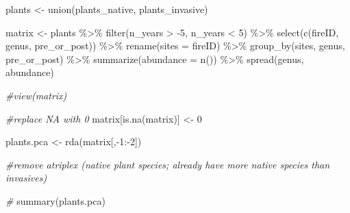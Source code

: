 \documentclass[
]{article}
\newenvironment{Shaded}{\begin{snugshade}}{\end{snugshade}}
\newcommand{\AttributeTok}[1]{\textcolor[rgb]{0.77,0.63,0.00}{#1}}
\newcommand{\CommentTok}[1]{\textcolor[rgb]{0.56,0.35,0.01}{\textit{#1}}}
\newcommand{\DecValTok}[1]{\textcolor[rgb]{0.00,0.00,0.81}{#1}}
\newcommand{\FunctionTok}[1]{\textcolor[rgb]{0.00,0.00,0.00}{#1}}
\newcommand{\NormalTok}[1]{#1}
\newcommand{\OtherTok}[1]{\textcolor[rgb]{0.56,0.35,0.01}{#1}}
\newcommand{\SpecialCharTok}[1]{\textcolor[rgb]{0.00,0.00,0.00}{#1}}
\begin{document}
\begin{Shaded}
\begin{Highlighting}[]
\NormalTok{plants }\OtherTok{\textless{}{-}} \FunctionTok{union}\NormalTok{(plants\_native, plants\_invasive)}

\NormalTok{matrix }\OtherTok{\textless{}{-}}\NormalTok{ plants }\SpecialCharTok{\%\textgreater{}\%}
  \FunctionTok{filter}\NormalTok{(n\_years }\SpecialCharTok{\textgreater{}} \SpecialCharTok{{-}}\DecValTok{5}\NormalTok{, n\_years }\SpecialCharTok{\textless{}} \DecValTok{5}\NormalTok{) }\SpecialCharTok{\%\textgreater{}\%}
  \FunctionTok{select}\NormalTok{(}\FunctionTok{c}\NormalTok{(fireID, genus, pre\_or\_post)) }\SpecialCharTok{\%\textgreater{}\%} 
  \FunctionTok{rename}\NormalTok{(}\AttributeTok{sites =}\NormalTok{ fireID) }\SpecialCharTok{\%\textgreater{}\%}  
  \FunctionTok{group\_by}\NormalTok{(sites, genus, pre\_or\_post) }\SpecialCharTok{\%\textgreater{}\%} 
  \FunctionTok{summarize}\NormalTok{(}\AttributeTok{abundance =} \FunctionTok{n}\NormalTok{()) }\SpecialCharTok{\%\textgreater{}\%} 
  \FunctionTok{spread}\NormalTok{(genus, abundance)}
  
\CommentTok{\#view(matrix)}

\CommentTok{\#replace NA with 0}
\NormalTok{matrix[}\FunctionTok{is.na}\NormalTok{(matrix)] }\OtherTok{\textless{}{-}} \DecValTok{0}

\NormalTok{plants.pca }\OtherTok{\textless{}{-}} \FunctionTok{rda}\NormalTok{(matrix[,}\SpecialCharTok{{-}}\DecValTok{1}\SpecialCharTok{:{-}}\DecValTok{2}\NormalTok{])}

\CommentTok{\#remove atriplex (native plant species; already have more native species than invasives)}

\CommentTok{\#}
\FunctionTok{summary}\NormalTok{(plants.pca)}
\end{Highlighting}
\end{Shaded}
\end{document}
